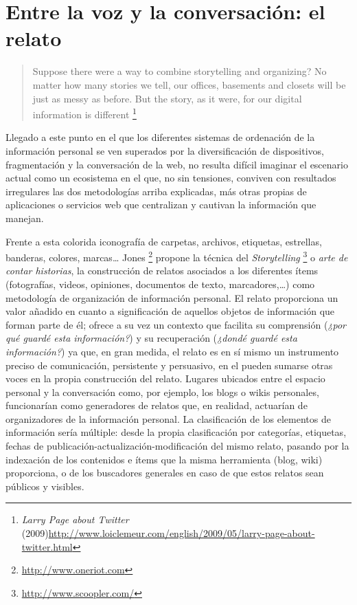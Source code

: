 \documentclass[12pt, a4paper,twoside]{book}
\begin{document}
\section{Entre la voz y la conversación: el relato}

\begin{quote}
Suppose there were a way to combine storytelling and organizing? No
matter how many stories we tell, our offices, basements and closets
will be just as messy as before. But the story, as it were, for our
digital information is different%
\footnote{\emph{Larry Page about Twitter}
(2009)\href{http://www.loiclemeur.com/english/2009/05/larry-page-about-twitter.html}{http://www.loiclemeur.com/english/2009/05/larry-page-about-twitter.html}}

\end{quote}
Llegado a este punto en el que los diferentes sistemas de
ordenación de la información personal se ven superados por la
diversificación de dispositivos, fragmentación y la conversación de
la web, no resulta difícil imaginar el escenario actual como un
ecosistema en el que, no sin tensiones, conviven con resultados
irregulares las dos metodologías arriba explicadas, más otras
propias de aplicaciones o servicios web que centralizan y cautivan
la información que manejan.

Frente a esta colorida iconografía de carpetas, archivos,
etiquetas, estrellas, banderas, colores, marcas\ldots{} Jones%
\footnote{\href{http://www.oneriot.com}{http://www.oneriot.com}}
propone la técnica del \emph{Storytelling}%
\footnote{\href{http://www.scoopler.com/}{http://www.scoopler.com/}}
o \emph{arte de contar historias}, la construcción de relatos
asociados a los diferentes ítems (fotografías, videos, opiniones,
documentos de texto, marcadores,\ldots{}) como metodología de
organización de información personal. El relato proporciona un
valor añadido en cuanto a significación de aquellos objetos de
información que forman parte de él; ofrece a su vez un contexto que
facilita su comprensión (\emph{¿por qué guardé esta información?})
y su recuperación (\emph{¿dondé guardé esta información?}) ya que,
en gran medida, el relato es en sí mismo un instrumento preciso de
comunicación, persistente y persuasivo, en el pueden sumarse otras
voces en la propia construcción del relato. Lugares ubicados entre
el espacio personal y la conversación como, por ejemplo, los blogs
o wikis personales, funcionarían como generadores de relatos que,
en realidad, actuarían de organizadores de la información personal.
La clasificación de los elementos de información sería múltiple:
desde la propia clasificación por categorías, etiquetas, fechas de
publicación-actualización-modificación del mismo relato, pasando
por la indexación de los contenidos e ítems que la misma
herramienta (blog, wiki) proporciona, o de los buscadores generales
en caso de que estos relatos sean públicos y visibles.
\end{document}
